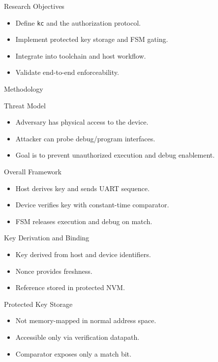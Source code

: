\documentclass[aspectratio=169]{beamer}
\begin{document}
\begin{frame}{Research Objectives}
  \begin{itemize}
    \item Define \texttt{kc} and the authorization protocol.
    \item Implement protected key storage and FSM gating.
    \item Integrate into toolchain and host workflow.
    \item Validate end-to-end enforceability.
  \end{itemize}
\end{frame}

\begin{frame}{Methodology}
\end{frame}

\begin{frame}{Threat Model}
  \begin{itemize}
    \item Adversary has physical access to the device.
    \item Attacker can probe debug/program interfaces.
    \item Goal is to prevent unauthorized execution and debug enablement.
  \end{itemize}
\end{frame}

\begin{frame}{Overall Framework}
  \begin{itemize}
    \item Host derives key and sends UART sequence.
    \item Device verifies key with constant-time comparator.
    \item FSM releases execution and debug on match.
  \end{itemize}
\end{frame}

\begin{frame}{Key Derivation and Binding}
  \begin{itemize}
    \item Key derived from host and device identifiers.
    \item Nonce provides freshness.
    \item Reference stored in protected NVM.
  \end{itemize}
\end{frame}

\begin{frame}{Protected Key Storage}
  \begin{itemize}
    \item Not memory-mapped in normal address space.
    \item Accessible only via verification datapath.
    \item Comparator exposes only a match bit.
  \end{itemize}
\end{frame}
\end{document}
